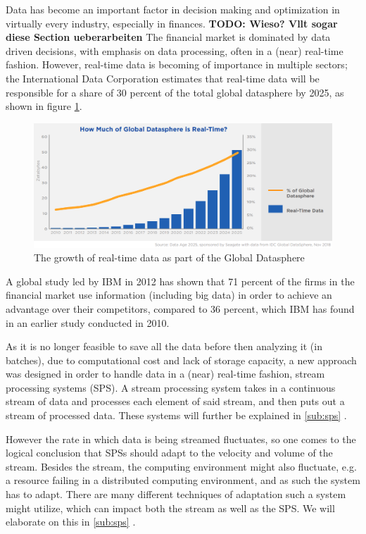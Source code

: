 Data has become an important factor in decision making and optimization in virtually every industry, especially in finances. \textbf{TODO: Wieso? Vllt sogar diese Section ueberarbeiten}
The financial market is dominated by data driven decisions, with emphasis on data processing, often in a (near) real-time fashion.
However, real-time data is becoming of importance in multiple sectors; the International Data Corporation estimates that real-time data will be 
responsible for a share of 30 percent of the total global datasphere by 2025, as shown in figure \ref{fig:growth_realtime_data}.
\begin{figure}[ht]
\centering
\includegraphics[width=1.0\textwidth]{Bilder/realtime_data.png}
\caption{The growth of real-time data as part of the Global Datasphere \cite[p.13]{idc-seagate-data}}
\label{fig:growth_realtime_data}
\end{figure}

A global study led by IBM in 2012 has shown that 71 percent of the firms in the financial market use information (including big data)
in order to achieve an advantage over their competitors, compared to 36 percent, which IBM has found in an earlier study conducted in 2010. \cite[p.1]{ibm-financial}

As it is no longer feasible to save all the data before then analyzing it (in batches), due to computational cost and lack of storage capacity, 
a new approach was designed in order to handle data in a (near) real-time fashion, stream processing systems (SPS). 
A stream processing system takes in a continuous stream of data and processes each element of said stream, and then puts out a stream of processed data.
These systems will further be explained in \ref{sub:sps} .

However the rate in which data is being streamed fluctuates, so one comes to the logical conclusion that SPSs should adapt to the velocity and volume of the stream.
Besides the stream, the computing environment might also fluctuate, e.g. a resource failing in a distributed computing environment, 
and as such the system has to adapt. There are many different techniques of adaptation such a system might utilize, 
which can impact both the stream as well as the SPS. We will elaborate on this in \ref{sub:sps} .

